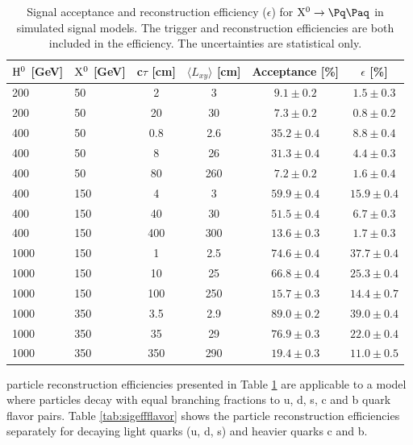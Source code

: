 \begin{table}[htbp]
\caption{
Signal acceptance and reconstruction efficiency ($\epsilon$) for $\X \to \qq$ in simulated signal models.
The trigger and reconstruction efficiencies are both included in the efficiency.
The uncertainties are statistical only.\label{tab:sigeff}}
\centering
\begin{tabular}{llcccc}
\hline
$\mathrm{H}^{0}$ [GeV] & $\mathrm{X^{0}}$ [GeV] & c$\tau$ [cm] & $\langle L_{xy} \rangle$ [cm] & Acceptance [\%] & $\epsilon$ [\%] \\
\hline
200 & 50 & 2 & 3 & $9.1\pm0.2$ & $1.5\pm0.3$ \\
200 & 50 & 20 & 30 & $7.3\pm0.2$ & $0.8\pm0.2$ \\
\hline
400 & 50 & 0.8 & 2.6 & $35.2\pm0.4$ & $8.8\pm0.4$ \\
400 & 50 & 8 & 26 & $31.3\pm0.4$ & $4.4\pm0.3$ \\
400 & 50 & 80 & 260 & $7.2\pm0.2$ & $1.6\pm0.4$ \\
\hline
400 & 150 & 4 & 3 & $59.9\pm0.4$ & $15.9\pm0.4$ \\
400 & 150 & 40 & 30 & $51.5\pm0.4$ & $6.7\pm0.3$ \\
400 & 150 & 400 & 300 & $13.6\pm0.3$ & $1.7\pm0.3$ \\
\hline 
1000 & 150 & 1 & 2.5 & $74.6\pm0.4$ & $37.7\pm0.4$ \\
1000 & 150 & 10 & 25 & $66.8\pm0.4$ & $25.3\pm0.4$ \\ 
1000 & 150 & 100 & 250 & $15.7\pm0.3$ & $14.4\pm0.7$ \\
\hline 
1000 & 350 & 3.5 & 2.9 & $89.0\pm0.2$ & $39.0\pm0.4$ \\
1000 & 350 & 35 & 29 & $76.9\pm0.3$ & $22.0\pm0.4$ \\
1000 & 350 & 350 & 290 & $19.4\pm0.3$ & $11.0\pm0.5$ \\
\hline
\end{tabular}
\end{table}

\X particle reconstruction efficiencies presented in Table \ref{tab:sigeff} 
are applicable to a model where \X particles decay with equal branching fractions to 
u, d, s, c and b quark flavor pairs.
Table \ref{tab:sigeffflavor} shows the \X particle reconstruction efficiencies separately for 
\X decaying light quarks (u, d, s) and
heavier quarks c and b. 

